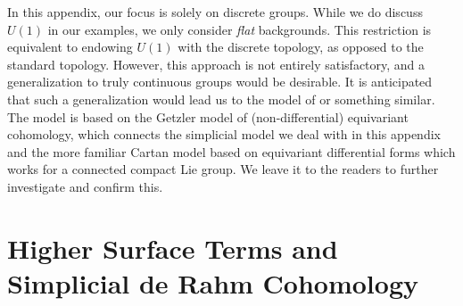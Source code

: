 \documentclass[
  letterpaper,
  DIV=11,
  numbers=noendperiod]{scrreport}
\newcounter{quartocalloutwrnno}
\newcommand{\quartocalloutwrn}[1]{\refstepcounter{quartocalloutwrnno}\label{#1}}
\begin{document}
\begin{tcolorbox}[enhanced jigsaw, opacityback=0, opacitybacktitle=0.6, leftrule=.75mm, arc=.35mm, coltitle=black, breakable, colframe=quarto-callout-warning-color-frame, titlerule=0mm, colback=white, bottomrule=.15mm, left=2mm, colbacktitle=quarto-callout-warning-color!10!white, toptitle=1mm, bottomtitle=1mm, title=\textcolor{quarto-callout-warning-color}{\faExclamationTriangle}\hspace{0.5em}{Warning \ref*{wrn-discrete-group}: Warning: we do not treat Lie groups honestly here}, rightrule=.15mm, toprule=.15mm]

\quartocalloutwrn{wrn-discrete-group} 

In this appendix, our focus is solely on discrete groups. While we do
discuss \(U(1)\) in our examples, we only consider \emph{flat}
backgrounds. This restriction is equivalent to endowing \(U(1)\) with
the discrete topology, as opposed to the standard topology. However,
this approach is not entirely satisfactory, and a generalization to
truly continuous groups would be desirable. It is anticipated that such
a generalization would lead us to the model of
\autocite{kubel2018equivariant} or something similar.\footnotemark{} The
model is based on the Getzler model of (non-differential) equivariant
cohomology, which connects the simplicial model we deal with in this
appendix and the more familiar Cartan model based on equivariant
differential forms which works for a connected compact Lie group. We
leave it to the readers to further investigate and confirm this.

\end{tcolorbox}


\section{Higher Surface Terms and Simplicial de Rahm
Cohomology}\label{sec-simplicial-cohomology}
\end{document}
